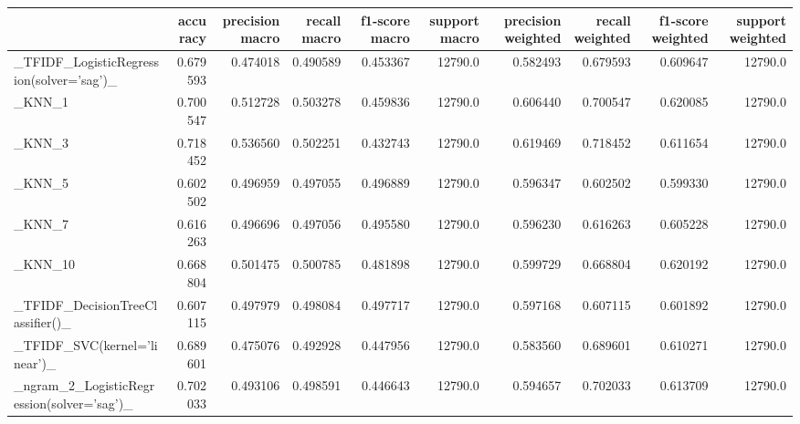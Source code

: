 \begin{tabular}{lrrrrrrrrr}
\toprule
{} &  accuracy &  precision macro &  recall macro &  f1-score macro &  support macro &  precision weighted &  recall weighted &  f1-score weighted &  support weighted \\
\midrule
\_TFIDF\_LogisticRegression(solver='sag')\_           &  0.679593 &         0.474018 &      0.490589 &        0.453367 &        12790.0 &            0.582493 &         0.679593 &           0.609647 &           12790.0 \\
\_KNN\_1                                             &  0.700547 &         0.512728 &      0.503278 &        0.459836 &        12790.0 &            0.606440 &         0.700547 &           0.620085 &           12790.0 \\
\_KNN\_3                                             &  0.718452 &         0.536560 &      0.502251 &        0.432743 &        12790.0 &            0.619469 &         0.718452 &           0.611654 &           12790.0 \\
\_KNN\_5                                             &  0.602502 &         0.496959 &      0.497055 &        0.496889 &        12790.0 &            0.596347 &         0.602502 &           0.599330 &           12790.0 \\
\_KNN\_7                                             &  0.616263 &         0.496696 &      0.497056 &        0.495580 &        12790.0 &            0.596230 &         0.616263 &           0.605228 &           12790.0 \\
\_KNN\_10                                            &  0.668804 &         0.501475 &      0.500785 &        0.481898 &        12790.0 &            0.599729 &         0.668804 &           0.620192 &           12790.0 \\
\_TFIDF\_DecisionTreeClassifier()\_                   &  0.607115 &         0.497979 &      0.498084 &        0.497717 &        12790.0 &            0.597168 &         0.607115 &           0.601892 &           12790.0 \\
\_TFIDF\_SVC(kernel='linear')\_                       &  0.689601 &         0.475076 &      0.492928 &        0.447956 &        12790.0 &            0.583560 &         0.689601 &           0.610271 &           12790.0 \\
\_ngram\_2\_LogisticRegression(solver='sag')\_         &  0.702033 &         0.493106 &      0.498591 &        0.446643 &        12790.0 &            0.594657 &         0.702033 &           0.613709 &           12790.0 \\

\end{tabular}

